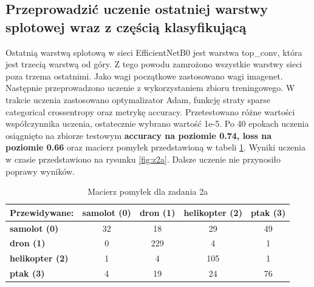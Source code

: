 \subsection{Przeprowadzić uczenie ostatniej warstwy splotowej wraz z częścią
klasyfikującą}

Ostatnią warstwą splotową w sieci EfficientNetB0 jest warstwa top\_conv, która jest trzecią warstwą od góry. Z tego powodu zamrożono wszystkie warstwy sieci poza trzema ostatnimi. Jako wagi początkowe zastosowano wagi imagenet. Następnie przeprowadzono uczenie z wykorzystaniem zbioru treningowego. W trakcie uczenia zastosowano optymalizator Adam, funkcję straty sparse categorical crossentropy oraz metrykę accuracy. Przetestowano różne wartości współczynnika uczenia, ostatecznie wybrano wartość 1e-5. Po 40 epokach uczenia osiągnięto na zbiorze testowym \textbf{accuracy na poziomie 0.74, loss na poziomie 0.66} oraz macierz pomyłek przedstawioną w tabeli \ref{tab:z2a}. Wyniki uczenia w czasie przedstawiono na rysunku \ref{fig:z2a}. Dalsze uczenie nie przynosiło poprawy wyników.



\begin{table}[ht]
\centering
\begin{tabular}{|l|c|c|c|c|}
\hline
Przewidywane: & \textbf{samolot (0)} & \textbf{dron (1)} & \textbf{helikopter (2)} & \textbf{ptak (3)} \\ \hline
\textbf{samolot (0)} & 32 & 18 & 29 & 49 \\ \hline
\textbf{dron (1)} & 0 & 229 & 4 & 1 \\ \hline
\textbf{helikopter (2)} & 1 & 4 & 105 & 1 \\ \hline
\textbf{ptak (3)} & 4 & 19 & 24 & 76 \\ \hline
\end{tabular}
\caption{Macierz pomyłek dla zadania 2a}
\label{tab:z2a}
\end{table}
    

